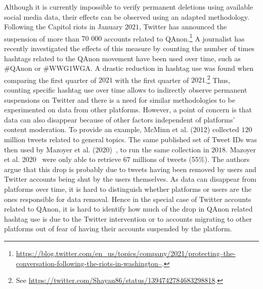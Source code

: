 \documentclass{article}
\begin{document}
Although it is currently impossible to verify permanent deletions using available social media data, their effects can be observed using an adapted methodology.
Following the Capitol riots in January $2021$, Twitter has announced the suspension of more than $70$ $000$ accounts related to QAnon.\footnote{\href{https://blog.twitter.com/en\_us/topics/company/2021/protecting--the-conversation-following-the-riots-in-washington--}{https://blog.twitter.com/en\_us/topics/company/2021/protecting--the-conversation-following-the-riots-in-washington--}.} 
A journalist has recently investigated the effects of this measure by counting the number of times hashtags related to the QAnon movement have been used over time, such as \#QAnon or \#WWG1WGA.
A drastic reduction in hashtag use was found when comparing the first quarter of $2021$ with the first quarter of $2021$.\footnote{See \href{https://twitter.com/Shayan86/status/1394742784683298818}{https://twitter.com/Shayan86/status/1394742784683298818}.}
Thus, counting specific hashtag use over time allows to indirectly observe permanent suspensions on Twitter and there is a need for similar methodologies to be experimented on data from other platforms.
However, a point of concern is that data can also disappear because of other factors independent of platforms' content moderation.
To provide an example, McMinn et al. (2012)\cite{mcminn2013building} collected $120$ million tweets related to general topics. 
The same published set of Tweet IDs was then used by Mazoyer et al. (2020)~\cite{mazoyer2020french}, to run the same collection in $2018$. Mazoyer et al. 2020~\cite{mazoyer2020french} were only able to retrieve $67$ millions of tweets (55\%). The authors argue that this drop is probably due to tweets having been removed by users and Twitter accounts being shut by the users themselves.
As data can disappear from platforms over time, it is hard to distinguish whether platforms or users are the ones responsible for data removal. 
Hence in the special case of Twitter accounts related to QAnon, it is hard to identify how much of the drop in QAnon related hashtag use is due to the Twitter intervention or to accounts migrating to other platforms out of fear of having their accounts suspended by the platform.

\smallskip 
\end{document}
